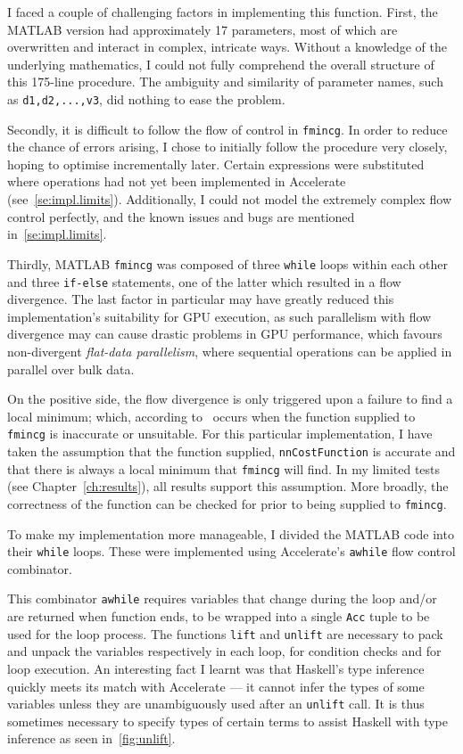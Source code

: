 I faced a couple of challenging factors in implementing this function. First, the MATLAB version had approximately 17 parameters, most of which are overwritten and interact in complex, intricate ways. Without a knowledge of the underlying mathematics, I could not fully comprehend the overall structure of this 175-line procedure. The ambiguity and similarity of parameter names, such as \texttt{d1,d2,...,v3}, did nothing to ease the problem. 

Secondly, it is difficult to follow the flow of control in \texttt{fmincg}. In order to reduce the chance of errors arising, I chose to initially follow the procedure very closely, hoping to optimise incrementally later. Certain expressions were substituted where operations had not yet been implemented in Accelerate (see~\ref{se:impl.limits}). Additionally, I could not model the extremely complex flow control perfectly, and the known issues and bugs are mentioned in~\ref{se:impl.limits}.

Thirdly, MATLAB \texttt{fmincg} was composed of three \texttt{while} loops within each other and three \texttt{if-else} statements, one of the latter which resulted in a flow divergence. The last factor in particular may have greatly reduced this implementation's suitability for GPU execution, as such parallelism with flow divergence may can cause drastic problems in GPU performance, which favours non-divergent \emph{flat-data parallelism}, where sequential operations can be applied in parallel over bulk data.

On the positive side, the flow divergence is only triggered upon a failure to find a local minimum; which, according to~\cite{Reb13} occurs when the function supplied to \texttt{fmincg} is inaccurate or unsuitable. For this particular implementation, I have taken the assumption that the function supplied, \texttt{nnCostFunction} is accurate and that there is always a local minimum that \texttt{fmincg} will find. In my limited tests (see Chapter~\ref{ch:results}), all results support this assumption. More broadly, the correctness of the function can be checked for prior to being supplied to \texttt{fmincg}.

To make my implementation more manageable, I divided the MATLAB code into their \texttt{while} loops. These were implemented using Accelerate's \texttt{awhile} flow control combinator. 

This combinator \texttt{awhile} requires variables that change during the loop and/or are returned when function ends, to be wrapped into a single \texttt{Acc} tuple to be used for the loop process. The functions \texttt{lift} and \texttt{unlift} are necessary to pack and unpack the variables respectively in each loop, for condition checks and for loop execution. An interesting fact I learnt was that Haskell's type inference quickly meets its match with Accelerate --- it cannot infer the types of some variables unless they are unambiguously used after an \texttt{unlift} call. It is thus sometimes necessary to specify types of certain terms to assist Haskell with type inference as seen in~\ref{fig:unlift}.

